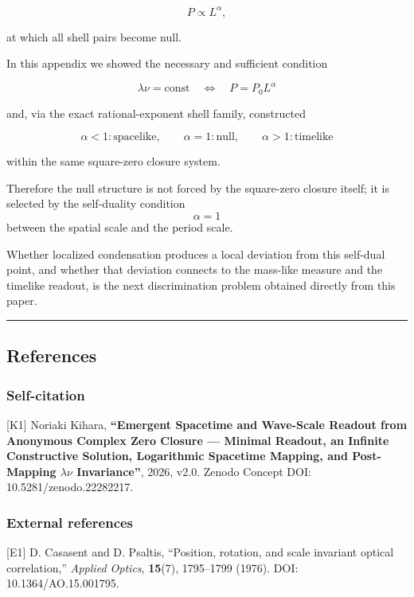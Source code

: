 \documentclass[
  a4paper,
]{article}
\begin{document}
\[
P\propto L^\alpha,
\]

at which all shell pairs become null.

In this appendix we showed the necessary and sufficient condition

\[
\boxed{
\lambda\nu=\mathrm{const}
\quad\Longleftrightarrow\quad
P=P_0L^\alpha
}
\]

and, via the exact rational-exponent shell family, constructed

\[
\boxed{
\alpha<1:
\text{spacelike},
\qquad
\alpha=1:
\text{null},
\qquad
\alpha>1:
\text{timelike}
}
\]

within the same square-zero closure system.

Therefore the null structure is not forced by the square-zero closure
itself; it is selected by the self-duality condition \[\alpha=1\]
between the spatial scale and the period scale.

Whether localized condensation produces a local deviation from this
self-dual point, and whether that deviation connects to the mass-like
measure and the timelike readout, is the next discrimination problem
obtained directly from this paper.

\begin{center}\rule{0.5\linewidth}{0.5pt}\end{center}

\subsection{References}\label{references}

\subsubsection{Self-citation}\label{self-citation}

{[}K1{]} Noriaki Kihara, \textbf{``Emergent Spacetime and Wave-Scale
Readout from Anonymous Complex Zero Closure --- Minimal Readout, an
Infinite Constructive Solution, Logarithmic Spacetime Mapping, and
Post-Mapping \(\lambda\nu\) Invariance''}, 2026, v2.0. Zenodo Concept
DOI: 10.5281/zenodo.22282217.

\subsubsection{External references}\label{external-references}

{[}E1{]} D. Casasent and D. Psaltis, ``Position, rotation, and scale
invariant optical correlation,'' \emph{Applied Optics}, \textbf{15}(7),
1795--1799 (1976). DOI: 10.1364/AO.15.001795.
\end{document}
